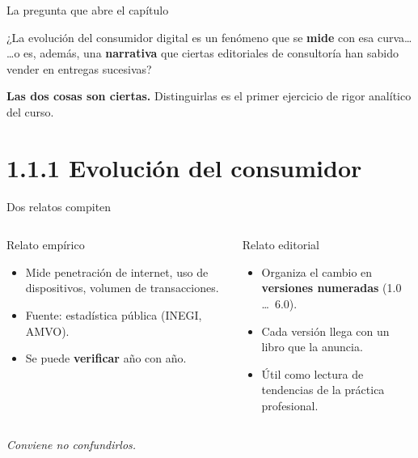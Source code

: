 \documentclass[aspectratio=169,xcolor=dvipsnames]{beamer}
\begin{document}
\begin{frame}{La pregunta que abre el capítulo}
\begin{center}
\begin{minipage}{0.85\textwidth}
\begin{block}{}
  \centering\large
  ¿La evolución del consumidor digital es un fenómeno que se \textbf{mide} con esa curva\ldots\\[6pt]
  \ldots o es, además, una \textbf{narrativa} que ciertas editoriales de consultoría han sabido vender en entregas sucesivas?
\end{block}
\end{minipage}
\end{center}
\vspace{10pt}
\pause
\begin{center}
  \textcolor{IPNguinda}{\textbf{Las dos cosas son ciertas.}} Distinguirlas es el primer ejercicio de rigor analítico del curso.
\end{center}
\end{frame}

\section[Evolución]{1.1.1 Evolución del consumidor}

\begin{frame}{Dos relatos compiten}
\begin{columns}[T]
  \begin{block}{Relato empírico}
    \begin{itemize}
      \item Mide penetración de internet, uso de dispositivos, volumen de transacciones.
      \item Fuente: estadística pública (INEGI, AMVO).
      \item Se puede \textbf{verificar} año con año.
    \end{itemize}
  \end{block}
  \begin{exampleblock}{Relato editorial}
    \begin{itemize}
      \item Organiza el cambio en \textbf{versiones numeradas} (1.0 \ldots\ 6.0).
      \item Cada versión llega con un libro que la anuncia.
      \item Útil como lectura de tendencias de la práctica profesional.
    \end{itemize}
  \end{exampleblock}
\end{columns}
\vspace{8pt}
\begin{center}
  \emph{Conviene no confundirlos.}
\end{center}
\end{frame}
\end{document}

